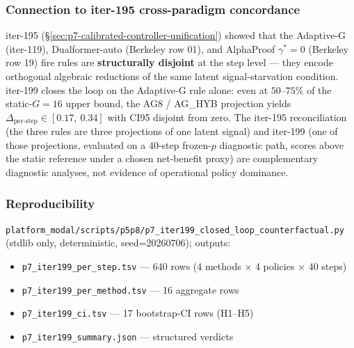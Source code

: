 \subsubsection*{Connection to iter-195 cross-paradigm concordance}

iter-195 (\S\ref{sec:p7-calibrated-controller-unification}) showed that the
Adaptive-G (iter-119), Dualformer-auto (Berkeley row 01), and AlphaProof
$\gamma^*=0$ (Berkeley row 19) fire rules are \textbf{structurally
disjoint} at the step level --- they encode orthogonal algebraic reductions of
the same latent signal-starvation condition. iter-199 closes the loop on the
Adaptive-G rule alone: even at $50$--$75\%$ of the static-$G=16$ upper bound,
the AG8 / AG\_HYB projection yields
$\Delta_{\text{per-step}} \in [0.17,\ 0.34]$ with CI95 disjoint from zero.
The iter-195 reconciliation (the three rules are three projections of one
latent signal) and iter-199 (one of those projections, evaluated on a
40-step frozen-$p$ diagnostic path, scores above the static reference under a
chosen net-benefit proxy) are complementary diagnostic analyses, not evidence
of operational policy dominance.

\subsubsection*{Reproducibility}

\texttt{platform_modal/scripts/p5p8/p7\_iter199\_closed\_loop\_counterfactual.py} (stdlib
only, deterministic, seed=20260706); outputs:
\begin{itemize}
\item \texttt{p7\_iter199\_per\_step.tsv} --- 640 rows (4 methods $\times$ 4 policies $\times$ 40 steps)
\item \texttt{p7\_iter199\_per\_method.tsv} --- 16 aggregate rows
\item \texttt{p7\_iter199\_ci.tsv} --- 17 bootstrap-CI rows (H1--H5)
\item \texttt{p7\_iter199\_summary.json} --- structured verdicts
\end{itemize}
